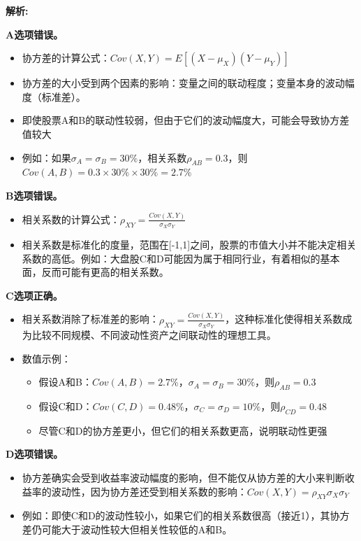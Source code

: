 \documentclass{article}
\newenvironment{explanation}
{\textbf{解析:}\par}
{\par}
\begin{document}
\begin{explanation}
\textbf{A选项错误。}
\begin{itemize}
    \item 协方差的计算公式：\(Cov(X,Y) = E[(X-\mu_X)(Y-\mu_Y)]\)
    \item 协方差的大小受到两个因素的影响：变量之间的联动程度；变量本身的波动幅度（标准差）。
    \item 即使股票A和B的联动性较弱，但由于它们的波动幅度大，可能会导致协方差值较大
    \item 例如：如果\(\sigma_A = \sigma_B = 30\%\)，相关系数\(\rho_{AB} = 0.3\)，则\(Cov(A,B) = 0.3 \times 30\% \times 30\% = 2.7\%\)
\end{itemize}

\textbf{B选项错误。}
\begin{itemize}
    \item 相关系数的计算公式：\(\rho_{XY} = \frac{Cov(X,Y)}{\sigma_X\sigma_Y}\)
    \item 相关系数是标准化的度量，范围在[-1,1]之间，股票的市值大小并不能决定相关系数的高低。例如：大盘股C和D可能因为属于相同行业，有着相似的基本面，反而可能有更高的相关系数。
\end{itemize}

\textbf{C选项正确。}
\begin{itemize}
    \item 相关系数消除了标准差的影响：\(\rho_{XY} = \frac{Cov(X,Y)}{\sigma_X\sigma_Y}\)，这种标准化使得相关系数成为比较不同规模、不同波动性资产之间联动性的理想工具。
    \item 数值示例：
        \begin{itemize}
            \item 假设A和B：\(Cov(A,B) = 2.7\%\)，\(\sigma_A = \sigma_B = 30\%\)，则\(\rho_{AB} = 0.3\)
            \item 假设C和D：\(Cov(C,D) = 0.48\%\)，\(\sigma_C = \sigma_D = 10\%\)，则\(\rho_{CD} = 0.48\)
            \item 尽管C和D的协方差更小，但它们的相关系数更高，说明联动性更强
        \end{itemize}
\end{itemize}

\textbf{D选项错误。}
\begin{itemize}
    \item 协方差确实会受到收益率波动幅度的影响，但不能仅从协方差的大小来判断收益率的波动性，因为协方差还受到相关系数的影响：\(Cov(X,Y) = \rho_{XY}\sigma_X\sigma_Y\)
    \item 例如：即使C和D的波动性较小，如果它们的相关系数很高（接近1），其协方差仍可能大于波动性较大但相关性较低的A和B。
\end{itemize}
\end{explanation}
\end{document}
